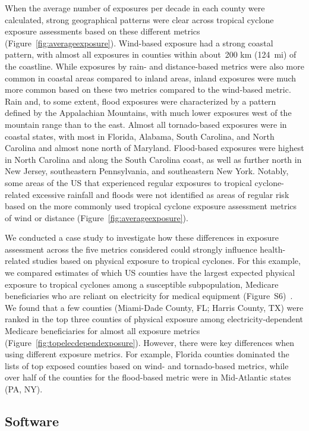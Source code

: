 When the average number of exposures per decade in each county were calculated,
strong geographical patterns were clear across tropical cyclone exposure
assessments based on these different metrics
(Figure~\ref{fig:averageexposure}). Wind-based exposure had a strong coastal
pattern, with almost all exposures in counties within about~200
\si{\kilo\metre} (124~mi) of the coastline. While exposures by rain- and
distance-based metrics were also more common in coastal areas compared to
inland areas, inland exposures were much more common based on these two metrics
compared to the wind-based metric. Rain and, to some extent, flood exposures
were characterized by a pattern defined by the Appalachian Mountains, with much
lower exposures west of the mountain range than to the east. Almost all
tornado-based exposures were in coastal states, with most in Florida, Alabama,
South Carolina, and North Carolina and almost none north of Maryland.
Flood-based exposures were highest in North Carolina and along the South
Carolina coast, as well as further north in New Jersey, southeastern
Pennsylvania, and southeastern New York. Notably, some areas of the \ac{US}
that experienced regular exposures to tropical cyclone-related excessive
rainfall and floods were not identified as areas of regular risk based on the
more commonly used tropical cyclone exposure assessment metrics of wind or
distance (Figure~\ref{fig:averageexposure}). 

We conducted a case study to investigate how these differences in exposure
assessment across the five metrics considered could strongly influence
health-related studies based on physical exposure to tropical cyclones. For
this example, we compared estimates of which \ac{US} counties have the largest
expected physical exposure to tropical cyclones among a susceptible
subpopulation, Medicare beneficiaries who are reliant on electricity for
medical equipment (Figure~S6)~\citep{empower}.  We found
that a few counties (Miami-Dade County, FL; Harris County, TX) were ranked in
the top three counties of physical exposure among electricity-dependent
Medicare beneficiaries for almost all exposure metrics
(Figure~\ref{fig:topelecdependexposure}). However, there were key differences
when using different exposure metrics. For example, Florida counties dominated
the lists of top exposed counties based on wind- and tornado-based metrics,
while over half of the counties for the flood-based metric were in Mid-Atlantic
states (PA, NY).

\subsection*{Software}

